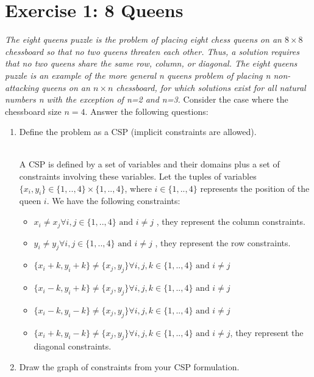 \documentclass[9pt,a4paper]{extarticle}
\newenvironment{solution}
    {%
    \color{red}
    }
    { 
    \color{black}
    }
\begin{document}
   \section*{Exercise 1: 8 Queens}
   \textit{The eight queens puzzle is the problem of placing eight chess queens on an $8\times8$ chessboard so that no two queens threaten each other. Thus, a solution requires that no two queens share the same row, column, or diagonal. The eight queens puzzle is an example of the more general n queens problem of placing n non-attacking queens on an $n\times n$ chessboard, for which solutions exist for all natural numbers n with the exception of n=2 and n=3.}%
   Consider the case where the chessboard size $n = 4$. Answer the following questions:
   \begin{enumerate}
       \item Define the problem as a CSP (implicit constraints are allowed). 
    \begin{solution}
    \\
     A CSP is defined by a set of variables and their domains plus a set of constraints involving these variables.
     Let the tuples of variables $\{x_i, y_i\} \in \{1,..,4\}\times \{1,..,4\}$, where  $i\in \{1,..,4\}$ represents the position of the queen $i$.
     We have the following constraints:
     \begin{itemize}
         \item $x_i \neq x_j \forall i, j \in \{1,..,4\} \text{ and } i \neq j$
 , they represent the column constraints.
 		\item $y_i \neq y_j \forall i, j \in \{1,..,4\} \text{ and } i \neq j$ , they represent the row constraints.
         \item $\{x_i+k, y_i+k\} \neq \{x_j, y_j\} \forall i, j, k \in \{1,..,4\} \text{ and } i \neq j$
         \item $\{x_i-k, y_i+k\} \neq \{x_j, y_j\} \forall i, j, k \in \{1,..,4\} \text{ and } i \neq j$
         \item $\{x_i-k, y_i-k\} \neq \{x_j, y_j\} \forall i, j, k \in \{1,..,4\} \text{ and } i \neq j$
         \item $\{x_i+k, y_i-k\} \neq \{x_j, y_j\} \forall i, j, k \in \{1,..,4\} \text{ and } i \neq j$,  they represent the diagonal constraints.
     \end{itemize}
     \end{solution}
       \item Draw the graph of constraints from your CSP formulation.

\end{enumerate}
\end{document}
